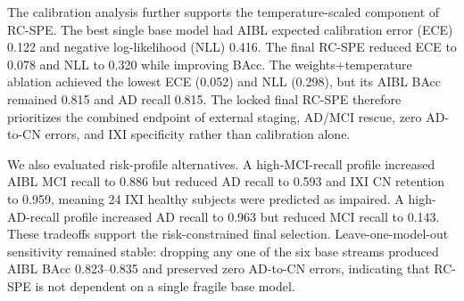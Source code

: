 \begin{table}[t]
\centering
\caption{Algorithmic ablation of RC-SPE. OASIS is reported only as a stress-test metric and was not used for final model selection.}
\label{tab:rcspe_ablation}
\scriptsize
{}
\end{table}

The calibration analysis further supports the temperature-scaled component of RC-SPE. The best single base model had AIBL expected calibration error (ECE) 0.122 and negative log-likelihood (NLL) 0.416. The final RC-SPE reduced ECE to 0.078 and NLL to 0.320 while improving BAcc. The weights+temperature ablation achieved the lowest ECE (0.052) and NLL (0.298), but its AIBL BAcc remained 0.815 and AD recall 0.815. The locked final RC-SPE therefore prioritizes the combined endpoint of external staging, AD/MCI rescue, zero AD-to-CN errors, and IXI specificity rather than calibration alone.

We also evaluated risk-profile alternatives. A high-MCI-recall profile increased AIBL MCI recall to 0.886 but reduced AD recall to 0.593 and IXI CN retention to 0.959, meaning 24 IXI healthy subjects were predicted as impaired. A high-AD-recall profile increased AD recall to 0.963 but reduced MCI recall to 0.143. These tradeoffs support the risk-constrained final selection. Leave-one-model-out sensitivity remained stable: dropping any one of the six base streams produced AIBL BAcc 0.823--0.835 and preserved zero AD-to-CN errors, indicating that RC-SPE is not dependent on a single fragile base model.

